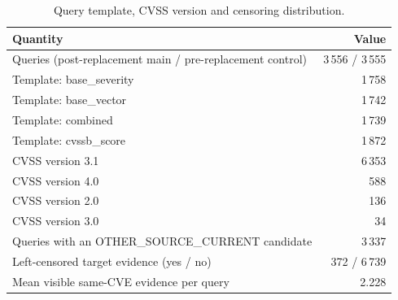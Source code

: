 \begin{table}\centering\small
\renewcommand{\arraystretch}{1.15}
\caption{Query template, CVSS version and censoring distribution.}\label{tab:sorguprofil}
\begin{tabular}{@{}lr@{}}\toprule
Quantity & Value \\\midrule
Queries (post-replacement main / pre-replacement control) & 3\,556 / 3\,555 \\
Template: base\_severity & 1\,758 \\
Template: base\_vector & 1\,742 \\
Template: combined & 1\,739 \\
Template: cvssb\_score & 1\,872 \\
CVSS version 3.1 & 6\,353 \\
CVSS version 4.0 & 588 \\
CVSS version 2.0 & 136 \\
CVSS version 3.0 & 34 \\
Queries with an OTHER\_SOURCE\_CURRENT candidate & 3\,337 \\
Left-censored target evidence (yes / no) & 372 / 6\,739 \\
Mean visible same-CVE evidence per query & 2.228 \\
\bottomrule
\end{tabular}
\end{table}
